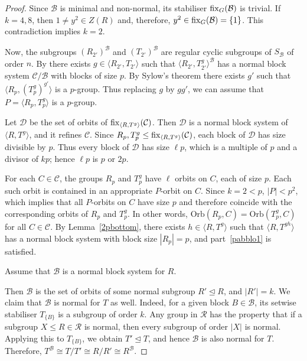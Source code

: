\documentclass[11pt]{amsart}
\numberwithin{equation}{section}
\theoremstyle{definition}
\newcounter{case}
\newenvironment{case}{\refstepcounter{case}
	\medskip \noindent {\bf Case \textup{\thecase.  }}}{\upshape}
\renewcommand{\thecase}{\arabic{case}}
\def\fix{{\rm fix}}
\newcommand{\sg}[1]{\langle{#1}\rangle}
\begin{document}
\begin{proof}
		Since $\mathcal{B}$ is minimal and non-normal, its stabiliser $\fix_{G}(\mathcal{B})$ is trivial. 		If $k=4,8$, then $1\neq y^2\in Z(R)$ and, therefore, $y^2\in\fix_{G}(\mathcal{B})=\{1\}$. This contradiction implies $k=2$. 
		
		Now, the subgroups $(R_{2'})^{\mathcal  B}$ and $(T_{2'})^{\mathcal  B}$ are regular cyclic subgroups of $S_{{\mathcal  B}}$ of order $n$.  By \cite[Theorem 4.9]{Muzychuk1999} there exists $g\in \sg{R_{2'},T_{2'}}$ such that $\sg{R_{2'},T_{2'}^g}^{\mathcal  B}$ has a normal block system ${\mathcal  C}/{\mathcal  B}$ with blocks of size $p$. 
		By Sylow's  theorem there exists $g'$ such that $\langle R_p,(T_p^g)^{g'}\rangle$ is a $p$-group. Thus replacing $g$ by $gg'$, we can assume that $P=\langle R_p,T_p^g\rangle$ is a $p$-group.
		
		Let ${\mathcal D}$ be the set of orbits of $\fix_{\langle R, T^g\rangle}({\mathcal C})$.  
		Then ${\mathcal D}$ is a normal block system of $\langle R, T^g\rangle$, and it refines ${\mathcal C}$.  
		Since $R_p, T_p^g \le \fix_{\langle R, T^g\rangle}({\mathcal C})$, each block of ${\mathcal D}$ has size divisible by $p$.  
		Thus every block of ${\mathcal D}$ has size $\ell p$,  which is a multiple of $p$ and a divisor of $kp$; hence $\ell p$ is $p$ or $2p$.
		
		For each $C \in {\mathcal C}$, the groups $R_p$ and $T_p^g$ have $\ell$ orbits on $C$, each of size $p$.  
		Each such orbit is contained in an appropriate $P$-orbit on $C$.  
		Since $k=2 < p$,  $|P| < p^{2}$, which implies that all $P$-orbits on $C$ have size $p$ and therefore coincide with the corresponding orbits of $R_p$ and $T_p^g$.  
		In other words, $\mathrm{Orb}(R_p,C) = \mathrm{Orb}(T_p^g,C)$ for all $C \in {\mathcal C}$.
		By Lemma~\ref{2pbottom}, there exists $h \in \langle R, T^g\rangle$ such that  
		$\langle R, T^{gh}\rangle$ has a normal block system with block size $|R_p| = p$,  
		and part~\eqref{pabblo1} is satisfied.
		
		
		\begin{case}
		Assume that ${\mathcal  B}$ is a normal block system for $R$.
		\end{case}
		
		Then ${\mathcal B}$ is the set of orbits of some normal subgroup $R' \trianglelefteq R$, and $|R'| = k$.  
		We claim that ${\mathcal B}$ is normal for $T$ as well.  
		Indeed, for a given block $B \in {\mathcal B}$, its setwise stabiliser $T_{\{B\}}$ is a subgroup of order $k$.  
		Any group in ${\mathcal R}$ has the property that if a subgroup $X \le R \in {\mathcal R}$ is normal, then every subgroup of order $|X|$ is normal.  
		Applying this to $T_{\{B\}}$, we obtain $T' \trianglelefteq T$, and hence ${\mathcal B}$ is also normal for $T$.
		Therefore, $T^{\mathcal B} \cong T/T' \cong R/R' \cong R^{\mathcal B}$.
		

\end{proof}
\end{document}
